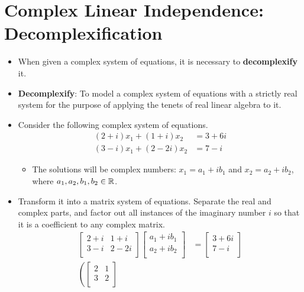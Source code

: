 \documentclass{article}
\begin{document}
\section*{Complex Linear Independence: Decomplexification}
\begin{itemize}
    \item {}When given a complex system of equations, it is necessary to \textbf{decomplexify} it.
    \item \textbf{Decomplexify}: To model a complex system of equations with a strictly real system for the purpose of applying the tenets of real linear algebra to it.
    \item Consider the following complex system of equations.
    \begin{align*}
        (2+i)x_1+(1+i)x_2 &= 3+6i\\
        (3-i)x_1+(2-2i)x_2 &= 7-i
    \end{align*}
    \begin{itemize}
        \item The solutions will be complex numbers: $x_1=a_1+ib_1$ and $x_2=a_2+ib_2$, where $a_1,a_2,b_1,b_2\in\mathbb{R}$.
    \end{itemize}
    \item Transform it into a matrix system of equations. Separate the real and complex parts, and factor out all instances of the imaginary number $i$ so that it is a coefficient to any complex matrix.
    \begin{align*}
        \begin{bmatrix}
            2+i & 1+i\\
            3-i & 2-2i\\
        \end{bmatrix}
        \begin{bmatrix}
            a_1+ib_1\\
            a_2+ib_2\\
        \end{bmatrix}
        &=
        \begin{bmatrix}
            3+6i\\
            7-i\\
        \end{bmatrix}\\
        \left(
            \begin{bmatrix}
                2 & 1\\
                3 & 2\\

\end{bmatrix}
\end{align*}
\end{itemize}
\end{document}
